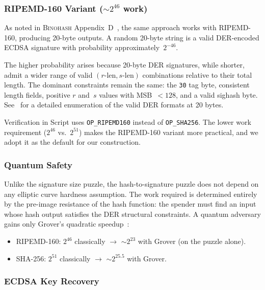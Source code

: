 \documentclass[11pt, a4paper]{article}
\begin{document}
\subsubsection{RIPEMD-160 Variant (${\sim}2^{46}$ work)}
\label{sec:ripemd-puzzle}

As noted in \textsc{Binohash} Appendix~D~\cite{linus2024binohash}, the same approach works with RIPEMD-160, producing 20-byte outputs. A random 20-byte string is a valid DER-encoded ECDSA signature with probability approximately~$2^{-46}$.

The higher probability arises because 20-byte DER signatures, while shorter, admit a wider range of valid $(r\text{-len}, s\text{-len})$ combinations relative to their total length. The dominant constraints remain the same: the \texttt{30} tag byte, consistent length fields, positive $r$ and~$s$ values with MSB~$< 128$, and a valid sighash byte. See~\cite[Appendix~D]{linus2024binohash} for a detailed enumeration of the valid DER formats at 20 bytes.

Verification in Script uses \texttt{OP\_RIPEMD160} instead of \texttt{OP\_SHA256}. The lower work requirement ($2^{46}$ vs.~$2^{51}$) makes the RIPEMD-160 variant more practical, and we adopt it as the default for our construction.

\subsubsection{Quantum Safety}
\label{sec:hash-puzzle-qs}

Unlike the signature size puzzle, the hash-to-signature puzzle does not depend on any elliptic curve hardness assumption. The work required is determined entirely by the pre-image resistance of the hash function: the spender must find an input whose hash output satisfies the DER structural constraints. A quantum adversary gains only Grover's quadratic speedup~\cite{grover1996}:

\begin{itemize}
    \item RIPEMD-160: $2^{46}$ classically $\to$ ${\sim}2^{23}$ with Grover (on the puzzle alone).
    \item SHA-256: $2^{51}$ classically $\to$ ${\sim}2^{25.5}$ with Grover.
\end{itemize}

\subsubsection{ECDSA Key Recovery}
\label{sec:key-recovery}
\end{document}
